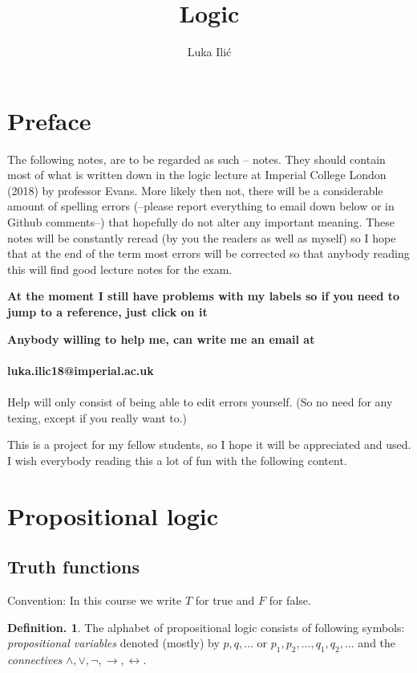 \documentclass[a4paper,oneside,11pt,DIV=12,parskip=half]{scrartcl}
\title{Logic}
\author{ Luka Ili\'{c}}
\theoremstyle{plain}
\theoremstyle{definition}
\newtheorem{definition}[theorem]{Definition.}
\newtheorem{remark, definition}[theorem]{Remark and Definition.}
\newtheorem{lemma, definition}[theorem]{Lemma and Definition.}
\newtheorem{theorem, definition}[theorem]{Theorem and Definition.}
\theoremstyle{remark}
\newtheorem*{remark, example}{\textbf{Remark and Exercise}}
\begin{document}
\maketitle

\pagebreak

\tableofcontents

\pagebreak

\section*{Preface}
The following notes, are to be regarded as such -- notes. They should contain most of what is written down in the logic lecture at Imperial College London (2018) by professor Evans. More likely then not, there will be a considerable amount of spelling errors (--please report everything to email down below or in Github comments--) that hopefully do not alter any important meaning. These notes will be constantly reread (by you the readers as well as myself) so I hope that at the end of the term most errors will be corrected so that anybody reading this will find good lecture notes for the exam.

\textbf{At the moment I still have problems with my labels so if you need to jump to a reference, just click on it}

\textbf{Anybody willing to help me, can write me an email at \\
\\ luka.ilic18@imperial.ac.uk} \\ \\ Help will only consist of being able to edit errors yourself. (So no need for any texing, except if you really want to.)

This is a project for my fellow students, so I hope it will be appreciated and used. I wish everybody reading this a lot of fun with the following content.

\pagebreak

\section{Propositional logic}

\subsection{Truth functions}
Convention: In this course we write $T$ for true and $F$ for false.

\begin{definition}
	The alphabet of propositional logic consists of following symbols:
 \emph{propositional variables} denoted (mostly) by $ p,q, \dots $ or 	$p_1,p_2,\dots, q_1, q_2, \dots$
	and the \emph{connectives} $\land, \lor, \lnot, \rightarrow, \leftrightarrow$.
\end{definition}
\end{document}
